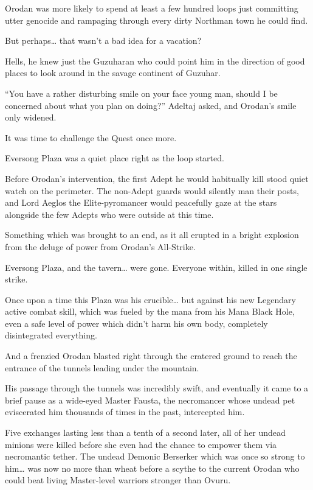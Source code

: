 \documentclass[a4paper,10pt]{book}
\begin{document}
Orodan was more likely to spend at least a few hundred loops just committing utter genocide and rampaging through every dirty Northman town he could find.\par
But perhaps… that wasn’t a bad idea for a vacation?\par
Hells, he knew just the Guzuharan who could point him in the direction of good places to look around in the savage continent of Guzuhar.\par
“You have a rather disturbing smile on your face young man, should I be concerned about what you plan on doing?” Adeltaj asked, and Orodan’s smile only widened.\par
It was time to challenge the Quest once more.\par
\par
Eversong Plaza was a quiet place right as the loop started.\par
Before Orodan’s intervention, the first Adept he would habitually kill stood quiet watch on the perimeter. The non-Adept guards would silently man their posts, and Lord Aeglos the Elite-pyromancer would peacefully gaze at the stars alongside the few Adepts who were outside at this time.\par
Something which was brought to an end, as it all erupted in a bright explosion from the deluge of power from Orodan’s All-Strike.\par
Eversong Plaza, and the tavern… were gone. Everyone within, killed in one single strike.\par
Once upon a time this Plaza was his crucible… but against his new Legendary active combat skill, which was fueled by the mana from his Mana Black Hole, even a safe level of power which didn’t harm his own body, completely disintegrated everything.\par
And a frenzied Orodan blasted right through the cratered ground to reach the entrance of the tunnels leading under the mountain.\par
His passage through the tunnels was incredibly swift, and eventually it came to a brief pause as a wide-eyed Master Fausta, the necromancer whose undead pet eviscerated him thousands of times in the past, intercepted him.\par
Five exchanges lasting less than a tenth of a second later, all of her undead minions were killed before she even had the chance to empower them via necromantic tether. The undead Demonic Berserker which was once so strong to him… was now no more than wheat before a scythe to the current Orodan who could beat living Master-level warriors stronger than Ovuru.\par
\end{document}
